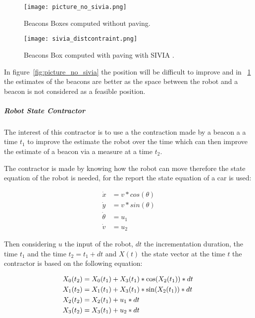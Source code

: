 \begin{figure}[H]
\centering
    \begin{minipage}[b]{0.4\textwidth}
    \texttt{[image: picture\_no\_sivia.png]}
    \caption{Beacons Boxes computed without paving.}
    \label{fig:picture_no_sivia}
    \end{minipage}
    \begin{minipage}[b]{0.4\textwidth}
    \texttt{[image: sivia\_distcontraint.png]}
    \caption{Beacons Box computed with paving with SIVIA \cite{jaulin1993set}.}
    \label{fig:sivia_distcontraint}
    \end{minipage}
\end{figure}

In figure~\ref{fig:picture_no_sivia} the position will be difficult to improve and in ~\ref{fig:sivia_distcontraint} the estimates of the beacons are better as the space between the robot and a beacon is not considered as a feasible position.

\subparagraph{Robot State Contractor}

 The interest of this contractor is to use a the contraction made by a beacon a a time $t_{1}$ to improve the estimate the robot over the time which can then improve the estimate of a beacon via a measure at a time $t_{2}$.

The contractor is made by knowing how the robot can move therefore the state equation of the robot is needed, for the report the state equation of a car is used:

\begin{align}
\dot{x} &= v*cos(\theta)\\
\dot{y} &= v*sin(\theta)\\
\dot{\theta} &= u_{1}\\
\dot{v} &= u_{2}
\end{align}

Then considering $u$ the input of the robot, $dt$ the incrementation duration, the time $t_{1}$ and the time $t_{2}=t_{1}+dt$ and $X(t)$ the state vector at the time $t$ the contractor is based on the following equation:  

\begin{align}
X_{0}(t_{2}) &= X_{0}(t_{1}) + X_{3}(t_{1})*\textnormal{cos}(X_{2}(t_{1}))*dt\,\\
X_{1}(t_{2}) &= X_{1}(t_{1}) + X_{3}(t_{1})*\textnormal{sin}(X_{2}(t_{1}))*dt\\
X_{2}(t_{2}) &= X_{2}(t_{1}) + u_{1}*dt\\
X_{3}(t_{2}) &= X_{3}(t_{1}) + u_{2}*dt
\end{align}

